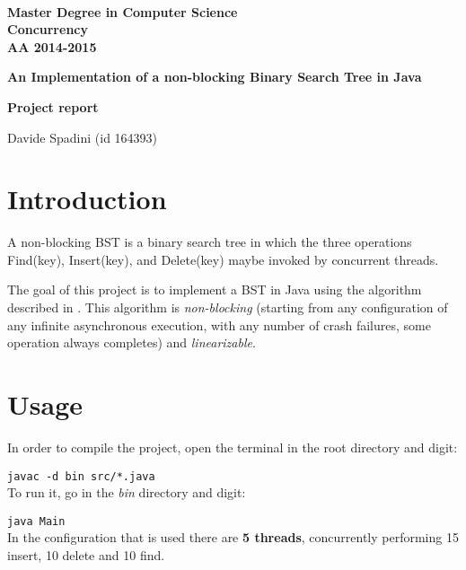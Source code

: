 \documentclass[a4paper]{article}
\begin{document}
\begin{centering}
~~~~~~~~~~~~~\\[-20mm]

  {
  \bfseries Master Degree in Computer Science\\[3mm]
  Concurrency\\[3mm]
  AA 2014-2015
  }\\[1mm]


  \vspace{0.5cm}
  {
  \Large \bfseries{An Implementation of a non-blocking Binary Search Tree in Java} \par
  }
  \vspace{0.2cm}
  {
  \small \bfseries{Project report} \par
  }
  \vspace{0.2cm}

  {Davide Spadini (id 164393)}

  \vspace{0.3cm}
\end{centering}



\section{Introduction}\label{introduction}
A non-blocking \ac{BST} is a binary search tree in which the three operations Find(key), Insert(key), and Delete(key) maybe invoked by concurrent threads.

The goal of this project is to implement a \ac{BST} in Java using the algorithm described in \cite{algorithm}. 
This algorithm is \emph{non-blocking} (starting from any configuration of any infinite asynchronous execution, with any number of crash failures, some operation always completes) and \emph{linearizable}.

\section{Usage} %
\label{sec:usage}

In order to compile the project, open the terminal in the root directory and digit:

\verb|javac -d bin src/*.java|
\\
\noindent
To run it, go in the \emph{bin} directory and digit:

\verb|java Main|
\\
\noindent
In the configuration that is used there are \textbf{5 threads}, concurrently performing 15 insert, 10 delete and 10 find.
\end{document}
